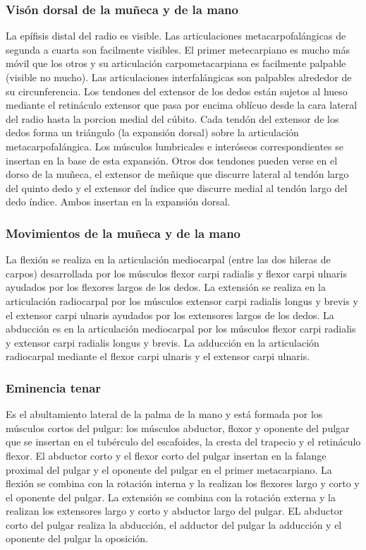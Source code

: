 \subsubsection{Visón dorsal de la muñeca y de la mano}
La epífisis distal del radio es visible. Las articulaciones metacarpofalángicas de segunda a cuarta son facilmente visibles. El primer metecarpiano es mucho más móvil que los otros y su articulación carpometacarpiana es facilmente palpable (visible no mucho). Las articulaciones interfalángicas son palpables alrededor de su circunferencia.
Los tendones del extensor de los dedos están sujetos al hueso mediante el retináculo extensor que pasa por encima oblícuo desde la cara lateral del radio hasta la porcion medial del cúbito. Cada tendón del extensor de los dedos forma un triángulo (la expansión dorsal) sobre la articulación metacarpofalángica. Los músculos lumbricales e interóseos correspondientes se insertan en la base de esta expansión. Otros dos tendones pueden verse en el dorso de la muñeca, el extensor de meñique que discurre lateral al tendón largo del quinto dedo y el extensor del índice que discurre medial al tendón largo del dedo índice. Ambos insertan en la expansión dorsal.

\subsubsection{Movimientos de la muñeca y de la mano}
La flexión se realiza en la articulación mediocarpal (entre las dos hileras de carpos) desarrollada por los músculos flexor carpi radialis y flexor carpi ulnaris ayudados por los flexores largos de los dedos. La extensión se realiza en la articulación radiocarpal por los músculos extensor carpi radialis longus y brevis y el extensor carpi ulnaris ayudados por los extensores largos de los dedos. La abducción es en la articulación mediocarpal por los músculos flexor carpi radialis y extensor carpi radialis longus y brevis. La adducción en la articulación radiocarpal mediante el flexor carpi ulnaris y el extensor carpi ulnaris.

\subsubsection{Eminencia tenar}
Es el abultamiento lateral de la palma de la mano y está formada por los músculos cortos del pulgar: los músculos abductor, floxor y oponente del pulgar que se insertan en el tubérculo del escafoides, la cresta del trapecio y el retináculo flexor. El abductor corto y el flexor corto del pulgar insertan en la falange proximal del pulgar y el oponente del pulgar en el primer metacarpiano.
La flexión se combina con la rotación interna y la realizan los flexores largo y corto y el oponente del pulgar. La extensión se combina con la rotación externa y la realizan los extensores largo y corto y abductor largo del pulgar. EL abductor corto del pulgar realiza la abducción, el adductor del pulgar la adducción y el oponente del pulgar la oposición.

